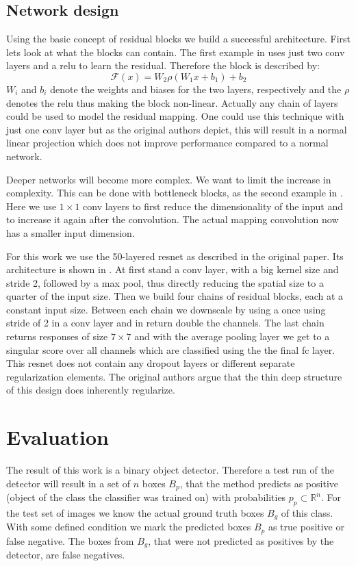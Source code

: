 \subsection{Network design}
\label{sec:concepts:resnet:design}
Using the basic concept of residual blocks we build a successful architecture. First lets look at what the blocks can contain. The first example in  uses just two \gls{conv} layers and a \gls{relu} to learn the residual. Therefore the block is described by:
\begin{equation}
    \mathcal{F}(x) = W_2\rho(W_1 x + b_1) + b_2
\end{equation}
$W_i$ and $b_i$ denote the weights and biases for the two layers, respectively and the $\rho$ denotes the \gls{relu} thus making the block non-linear. Actually any chain of layers could be used to model the residual mapping. One could use this technique with just one \gls{conv} layer but as the original authors \citep{he_deep_2016} depict, this will result in a normal linear projection which does not improve performance compared to a normal network.

Deeper networks will become more complex. We want to limit the increase in complexity. This can be done with bottleneck blocks, as the second example in . Here we use $1\times1$ \gls{conv} layers to first reduce the dimensionality of the input and to increase it again after the convolution. The actual mapping convolution now has a smaller input dimension.

For this work we use the 50-layered \gls{resnet} as described in the original paper. Its architecture is shown in . At first stand a \gls{conv} layer, with a big kernel size and stride 2, followed by a max pool,  thus directly reducing the spatial size to a quarter of the input size. Then we build four chains of residual blocks, each at a constant input size. Between each chain we downscale by using a once using stride of 2 in a \gls{conv} layer and in return double the channels. The last chain returns responses  of size $7 \times 7$ and with the average pooling layer we get to a singular score over all channels which are classified using the the final \gls{fc} layer.\\
This \gls{resnet} does not contain any dropout layers or different separate regularization elements. The original authors argue that the thin deep structure of this design does inherently regularize.

\clearpage
\section{Evaluation}
\label{sec:concepts:eval}
The result of this work is a binary object detector. Therefore a test run of the detector will result in a set of $n$ boxes $B_p$, that the method predicts as positive (object of the class the classifier was trained on) with probabilities $p_p \subset \mathbb{R}^n$. For the test set of images we know the actual ground truth boxes $B_g$ of this class. With some defined condition we mark the predicted boxes $B_p$ as true positive or false negative. The boxes from $B_g$, that were not predicted as positives by the detector, are false negatives.


